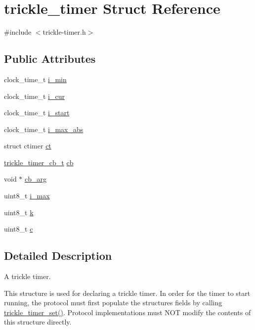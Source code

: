 \hypertarget{structtrickle__timer}{}\section{trickle\+\_\+timer Struct Reference}
\label{structtrickle__timer}


{\ttfamily \#include $<$trickle-\/timer.\+h$>$}

\subsection*{Public Attributes}
\begin{DoxyCompactItemize}
\item 
clock\+\_\+time\+\_\+t \hyperlink{structtrickle__timer_ad47176bf75ac13d688865dec639db430}{i\+\_\+min}
\item 
clock\+\_\+time\+\_\+t \hyperlink{structtrickle__timer_a2e49b516f2674d3c8e0fecdd72db0c8e}{i\+\_\+cur}
\item 
clock\+\_\+time\+\_\+t \hyperlink{structtrickle__timer_aeabbbddcf3e3b015e9a8fd9f211bb21d}{i\+\_\+start}
\item 
clock\+\_\+time\+\_\+t \hyperlink{structtrickle__timer_a4d0201ed9a65814148348f80d907f1a5}{i\+\_\+max\+\_\+abs}
\item 
struct ctimer \hyperlink{structtrickle__timer_abba9590b99980735bac34f144b151e0d}{ct}
\item 
\hyperlink{group__trickle-timer_ga243193848d28e6373682b8bd2e25850a}{trickle\+\_\+timer\+\_\+cb\+\_\+t} \hyperlink{structtrickle__timer_a7cf2370dcfcb2984770ad4f37a1524e9}{cb}
\item 
void $\ast$ \hyperlink{structtrickle__timer_a1b10a45b744a240c4c6a4eaeffc8d82c}{cb\+\_\+arg}
\item 
uint8\+\_\+t \hyperlink{structtrickle__timer_a3985822217cd5698c656bad071e7ce97}{i\+\_\+max}
\item 
uint8\+\_\+t \hyperlink{structtrickle__timer_a4d6ff0dd8bbb0c95250d78e452dabacf}{k}
\item 
uint8\+\_\+t \hyperlink{structtrickle__timer_a0a68c3dfc466cbdbfbc8e1cc1fd910fe}{c}
\end{DoxyCompactItemize}


\subsection{Detailed Description}
A trickle timer.

This structure is used for declaring a trickle timer. In order for the timer to start running, the protocol must first populate the structure\textquotesingle{}s fields by calling \hyperlink{group__trickle-timer_ga57b03043f109c0b2adb1dc92637ee8b4}{trickle\+\_\+timer\+\_\+set()}. Protocol implementations must N\+O\+T modify the contents of this structure directly.

